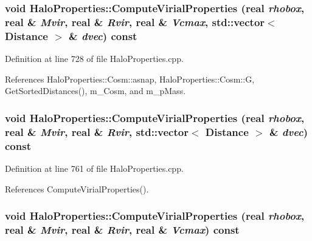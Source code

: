 \subsubsection[{ComputeVirialProperties}]{\setlength{\rightskip}{0pt plus 5cm}void HaloProperties::ComputeVirialProperties ({\bf real} {\em rhobox}, \/  {\bf real} \& {\em Mvir}, \/  {\bf real} \& {\em Rvir}, \/  {\bf real} \& {\em Vcmax}, \/  std::vector$<$ {\bf Distance} $>$ \& {\em dvec}) const}\label{classHaloProperties_a1363b40a961c241a3099133e79969f8a}


Definition at line 728 of file HaloProperties.cpp.



References HaloProperties::Cosm::asnap, HaloProperties::Cosm::G, GetSortedDistances(), m\_\-Cosm, and m\_\-pMass.

\subsubsection[{ComputeVirialProperties}]{\setlength{\rightskip}{0pt plus 5cm}void HaloProperties::ComputeVirialProperties ({\bf real} {\em rhobox}, \/  {\bf real} \& {\em Mvir}, \/  {\bf real} \& {\em Rvir}, \/  std::vector$<$ {\bf Distance} $>$ \& {\em dvec}) const}\label{classHaloProperties_a489eb6a9bcc51e46f3c3db91a4f104da}


Definition at line 761 of file HaloProperties.cpp.



References ComputeVirialProperties().

\subsubsection[{ComputeVirialProperties}]{\setlength{\rightskip}{0pt plus 5cm}void HaloProperties::ComputeVirialProperties ({\bf real} {\em rhobox}, \/  {\bf real} \& {\em Mvir}, \/  {\bf real} \& {\em Rvir}, \/  {\bf real} \& {\em Vcmax}) const}\label{classHaloProperties_ab703450a3ad8b89221ae9463e0a2d58d}


